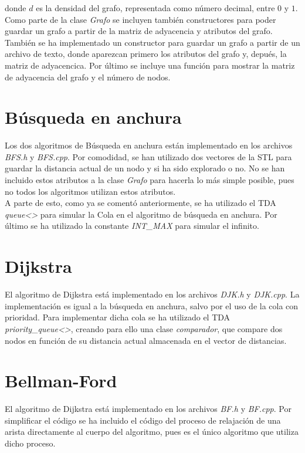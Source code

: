 donde $d$ es la densidad del grafo, representada como número decimal, entre $0$ y $1$. \\

Como parte de la clase \textit{Grafo} se incluyen también constructores para poder guardar un grafo a partir de la matriz de adyacencia y atributos del grafo. También se ha implementado un constructor para guardar un grafo a partir de un archivo de texto, donde aparezcan primero los atributos del grafo y, depués, la matriz de adyacencica. Por último se incluye una función para mostrar la matriz de adyacencia del grafo y el número de nodos.

\section{Búsqueda en anchura}

Los dos algoritmos de Búsqueda en anchura están implementado en los archivos \textit{BFS.h} y \textit{BFS.cpp}. Por comodidad, se han utilizado dos vectores de la STL para guardar la distancia actual de un nodo y si ha sido explorado o no. No se han incluido estos atributos a la clase \textit{Grafo} para hacerla lo más simple posible, pues no todos los algoritmos utilizan estos atributos. \\

A parte de esto, como ya se comentó anteriormente, se ha utilizado el TDA \textit{queue<>} para simular la Cola en el algoritmo de búsqueda en anchura. Por último se ha utilizado la constante \textit{INT\_MAX} para simular el infinito.

\section{Dijkstra}

El algoritmo de Dijkstra está implementado en los archivos \textit{DJK.h} y \textit{DJK.cpp}. La implementación es igual a la búsqueda en anchura, salvo por el uso de la cola con prioridad. Para implementar dicha cola se ha utilizado el TDA \textit{priority\_queue<>}, creando para ello una clase \textit{comparador}, que compare dos nodos en función de su distancia actual almacenada en el vector de distancias.

\section{Bellman-Ford}

El algoritmo de Dijkstra está implementado en los archivos \textit{BF.h} y \textit{BF.cpp}. Por simplificar el código se ha incluido el código del proceso de relajación de una arista directamente al cuerpo del algoritmo, pues es el único algoritmo que utiliza dicho proceso. \\


